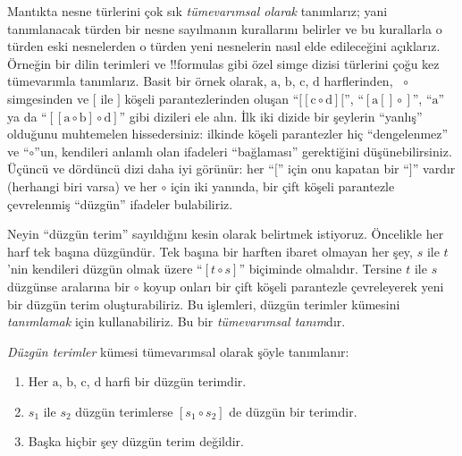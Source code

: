 \documentclass[../../../include/open-logic-section]{subfiles}
\begin{document}


Mantıkta nesne türlerini çok sık \emph{tümevarımsal olarak} tanımlarız;
yani tanımlanacak türden bir nesne sayılmanın kurallarını belirler ve bu
kurallarla o türden eski nesnelerden o türden yeni nesnelerin nasıl elde
edileceğini açıklarız. Örneğin bir dilin terimleri ve !!{formula}s gibi
özel simge dizisi türlerini çoğu kez tümevarımla tanımlarız. Basit bir
örnek olarak, $\mathrm{a}$, $\mathrm{b}$, $\mathrm{c}$, $\mathrm{d}$ harflerinden,
~$\circ$ simgesinden ve $[$ ile $]$ köşeli parantezlerinden oluşan
``$[[\mathrm{c} \circ \mathrm{d}][$'', ``$[\mathrm{a}[]\circ]$'',
``$\mathrm{a}$'' ya da ``$[[\mathrm{a} \circ \mathrm{b}]\circ
\mathrm{d}]$'' gibi dizileri ele alın. İlk iki dizide bir şeylerin
``yanlış'' olduğunu muhtemelen hissedersiniz: ilkinde köşeli parantezler
hiç ``dengelenmez'' ve ``$\circ$''un, kendileri anlamlı olan ifadeleri
``bağlaması'' gerektiğini düşünebilirsiniz. Üçüncü ve dördüncü dizi daha
iyi görünür: her ``$[$'' için onu kapatan bir ``$]$'' vardır (herhangi
biri varsa) ve her $\circ$ için iki yanında, bir çift köşeli parantezle
çevrelenmiş ``düzgün'' ifadeler bulabiliriz.

Neyin ``düzgün terim'' sayıldığını kesin olarak belirtmek istiyoruz.
Öncelikle her harf tek başına düzgündür. Tek başına bir harften ibaret
olmayan her şey, $s$ ile $t$'nin kendileri düzgün olmak üzere ``$[t
\circ s]$'' biçiminde olmalıdır. Tersine $t$ ile $s$ düzgünse aralarına
bir $\circ$ koyup onları bir çift köşeli parantezle çevreleyerek yeni
bir düzgün terim oluşturabiliriz. Bu işlemleri, düzgün terimler
kümesini \emph{tanımlamak} için kullanabiliriz. Bu bir \emph{tümevarımsal
  tanım}dır.

\begin{defn}
  \emph{Düzgün terimler} kümesi tümevarımsal olarak şöyle tanımlanır:
  \begin{enumerate}
  \item Her $\mathrm{a}$, $\mathrm{b}$, $\mathrm{c}$, $\mathrm{d}$
    harfi bir düzgün terimdir.
  \item $s_1$ ile $s_2$ düzgün terimlerse $[s_1 \circ s_2]$ de düzgün
    bir terimdir.
  \item Başka hiçbir şey düzgün terim değildir.
  \end{enumerate}
\end{defn}
\end{document}
